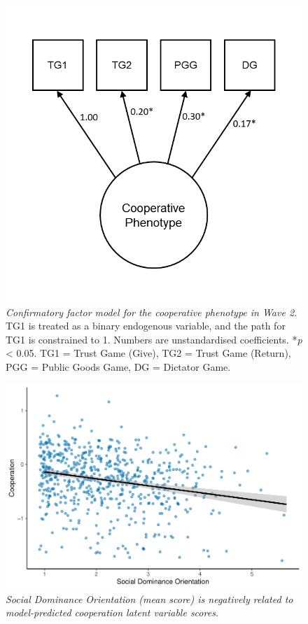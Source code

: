\documentclass[
  man,floatsintext]{apa6}
\begin{document}
\newpage



\begin{figure}
\includegraphics[width=0.8\linewidth]{images/cfa1} \caption{\emph{Confirmatory factor model for the cooperative phenotype in Wave 2.} TG1 is treated as a binary endogenous variable, and the path for TG1 is constrained to 1. Numbers are unstandardised coefficients. *\emph{p} \textless{} 0.05. TG1 = Trust Game (Give), TG2 = Trust Game (Return), PGG = Public Goods Game, DG = Dictator Game.}\label{fig:cfa1Plot}
\end{figure}

\newpage



\begin{figure}
\includegraphics[width=0.8\linewidth]{manuscript_files/figure-latex/sem1Plot-1} \caption{\emph{Social Dominance Orientation (mean score) is negatively related to model-predicted cooperation latent variable scores.}}\label{fig:sem1Plot}
\end{figure}
\end{document}
